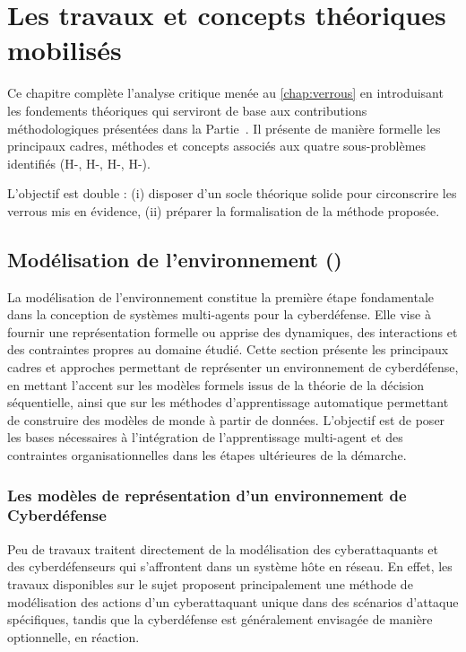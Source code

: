 \clearpage
\thispagestyle{empty}
\null
\newpage

\chapter{Les travaux et concepts théoriques mobilisés}
\label{chap:concepts}

\noindent
Ce chapitre complète l’analyse critique menée au \autoref{chap:verrous} en introduisant
les fondements théoriques qui serviront de base aux contributions méthodologiques
présentées dans la Partie~.
Il présente de manière formelle les principaux cadres, méthodes et concepts
associés aux quatre sous-problèmes identifiés (H-, H-, H-, H-).

L’objectif est double :
(i) disposer d’un socle théorique solide pour circonscrire les verrous mis en évidence,
(ii) préparer la formalisation de la méthode proposée.

\section{Modélisation de l'environnement ()}

\noindent
La modélisation de l'environnement constitue la première étape fondamentale dans la conception de systèmes multi-agents pour la cyberdéfense. Elle vise à fournir une représentation formelle ou apprise des dynamiques, des interactions et des contraintes propres au domaine étudié. Cette section présente les principaux cadres et approches permettant de représenter un environnement de cyberdéfense, en mettant l'accent sur les modèles formels issus de la théorie de la décision séquentielle, ainsi que sur les méthodes d'apprentissage automatique permettant de construire des modèles de monde à partir de données. L'objectif est de poser les bases nécessaires à l'intégration de l'apprentissage multi-agent et des contraintes organisationnelles dans les étapes ultérieures de la démarche.

\subsection{Les modèles de représentation d'un environnement de Cyberdéfense}

Peu de travaux traitent directement de la modélisation des cyberattaquants et des cyberdéfenseurs qui s'affrontent dans un système hôte en réseau. En effet, les travaux disponibles sur le sujet proposent principalement une méthode de modélisation des actions d'un cyberattaquant unique dans des scénarios d'attaque spécifiques, tandis que la cyberdéfense est généralement envisagée de manière optionnelle, en réaction.

